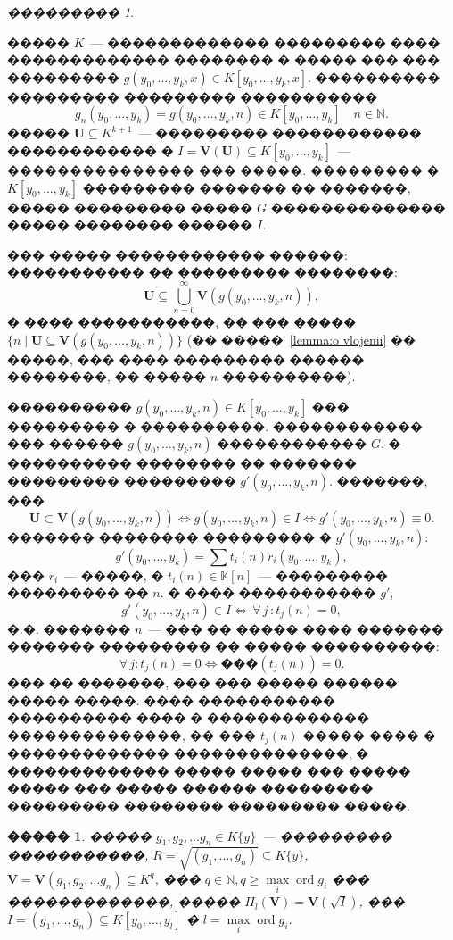 \documentclass[16pt]{article}
\DeclareMathOperator{\ord}{ord}
\theoremstyle{plain}
\newtheorem{lemma}[theorem]{�����}
\theoremstyle{definition}
\theoremstyle{remark}
\newtheorem{remark}[theorem]{���������}
\begin{document}
\begin{remark}\label{remark:o vlojenii}

����� $K$~--- ������������� ��������� ���� �������������
�������� � ����� ��� ��� ��������� $ g(y_0,\ldots,y_k,x)\in
K[y_0,\ldots,y_k,x]$. ���������� ��������� ��������� �����������
$$
g_n(y_0,\ldots,y_k) = g(y_0,\ldots,y_k,n) \in K[y_0,\ldots,y_k]\quad
n\in \mathbb N.
$$
����� $\mathbf{U}\subseteq K^{k+1}$~--- ��������� ������������ ������������ �
$I=\mathbf{V}(\mathbf{U})\subseteq K[y_0,\ldots,y_k]$~---
��������������� ��� �����. ��������� � $K[y_0,\ldots,y_k]$ ���������
������� �� �������, ����� ��������� ����� $G$ �������������� �����
�������� ������ $I$.

��� ����� ������������ ������: ����������� �� ��������� ��������:
$$
\mathbf{U}\subseteq \bigcup_{n=0}^{\infty}\mathbf{V}(g(y_0,\ldots,y_k,n)),
$$
� ���� �����������, �� ��� ����� $\{n\mid\mathbf{U}\subseteq \mathbf{V}(g(y_0,\ldots,y_k,n))\}$ (�� �����~\ref{lemma:o vlojenii} �� �����, ��� ���� ��������� ������ ��������, �� ����� $n$ ����������).

���������� $g(y_0,\ldots,y_k,n)\in K[y_0,\ldots,y_k]$ ��� ��������� � ����������. ������������ ��� ������ $g(y_0,\ldots,y_k,n)$ ������������ $G$. � ���������� �������� �� ������� ��������� ��������� $g'(y_0,\ldots,y_k,n)$. �������, ���
$$
\mathbf{U} \subset \mathbf{V}(g(y_0,\ldots, y_k,n))
\Leftrightarrow g(y_0,\ldots, y_k,n)\in I\Leftrightarrow
g'(y_0,\ldots, y_k,n)\equiv0.
$$
������� �������� ��������� � $g'(y_0,\ldots, y_k,n)$:
$$
g'(y_0,\ldots, y_k)=\sum\limits t_i(n)r_i(y_0,\ldots, y_k),
$$
��� $r_i$~--- �����, � $t_i(n)\in\mathbb{K}[n]$~--- ��������� ��������� �� $n$.
� ���� ����������� $g'$,
$$
g'(y_0,\ldots, y_k,n)\in I\Leftrightarrow\, \forall\, j\,: t_j(n)=0,
$$
�.�. ������� $n$~--- ��� �� ����� ���� ������� ������� ��������� ��
����� ����������:
$$
\forall\, j:t_j(n)=0\Leftrightarrow \text{���}(t_j(n))=0.
$$
��� �� �������, ��� ��� ����� ������ ����� �����. ���� �����������
���������� ���� � ������������� ��������������, �� ��� $t_j(n)$
����� ���� � ������������� ��������������, � ������������� �����
����� ��� ����� ����� ��� ����� ������ ��������� ��������� ��������
��������� �����.
\end{remark}


\begin{lemma} \label{lemma:o proekcii}
����� $g_1,g_2,\ldots g_n\in K\{y\}$~--- ��������� �����������, $R=\sqrt{(g_1,\ldots,g_n)}\subseteq K\{y\}$, $\mathbf{V}=\mathbf{V}(g_1,g_2,\ldots g_n)\subseteq K^{q}$, ��� $q\in \mathbb{N},q\geqslant \max\limits_i\ord g_i$ ��� �������������, ����� $\Pi_l(\mathbf{V})=\mathbf{V}(\sqrt{I})$, ��� $I =(g_1,\ldots,g_n)\subseteq K[y_0,\ldots,y_l]$ � $l=\max\limits_i\ord g_i$.

\end{lemma}
\end{document}
